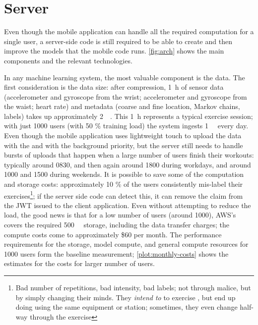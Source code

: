 \section{Server}
Even though the mobile application can handle all the required computation for a single user, a server-side code is still required to be able to create and then improve the models that the mobile code runs. \autoref{fig:arch} shows the main components and the relevant technologies.


In any machine learning system, the most valuable component is the data. The first consideration is the data size: after compression, \SI{1}{\hour} of sensor data (accelerometer and gyroscope from the wrist; accelerometer and gyroscope from the waist; heart rate) and metadata (coarse and fine location, Markov chains, labels) takes up approximately \SI{2}{\mebi\byte}. This \SI{1}{\hour} represents a typical exercise session; with just 1000 users (with 50 \% training load) the system ingests \SI{1}{\gibi\byte} every day. Even though the mobile application uses lightweight touch to upload the data with the  and  with the background priority, but the server still needs to handle bursts of uploads that happen when a large number of users finish their workouts: typically around 0830, and then again around 1800 during workdays, and around 1000 and 1500 during weekends. It is possible to save some of the computation and storage costs: approximately 10 \% of the users consistently mis-label their exercises\footnote{Bad number of repetitions, bad intensity, bad labels; not through malice, but by simply changing their minds. They \emph{intend to} to exercise , but end up doing  using the same equipment or station; sometimes, they even change half-way through the exercise}; if the server side code can detect this, it can remove the  claim from the JWT issued to the client application. Even without attempting to reduce the load, the good news is that for a low number of users (around 1000), AWS's  covers the required \SI{500}{\gibi\byte} storage, including the data transfer charges; the compute costs come to approximately \$60 per month. The performance requirements for the storage, model compute, and general compute resources for 1000 users form the baseline measurement; \autoref{plot:monthly-costs} shows the estimates for the costs for larger number of users. 

